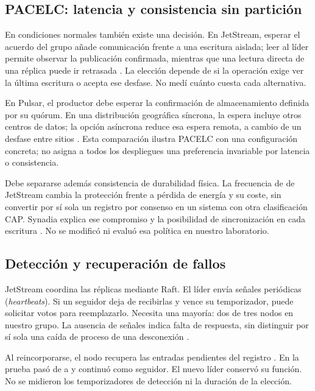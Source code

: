 \documentclass[11pt,a4paper]{article}
\newcommand{\archivo}[1]{\texttt{\detokenize{#1}}}
\begin{document}
\subsection{PACELC: latencia y consistencia sin partición}
En condiciones normales también existe una decisión. En JetStream, esperar el acuerdo del grupo añade comunicación frente a una escritura aislada; leer al líder permite observar la publicación confirmada, mientras que una lectura directa de una réplica puede ir retrasada \cite{natsReplicacion}. La elección depende de si la operación exige ver la última escritura o acepta ese desfase. No medí cuánto cuesta cada alternativa.

En Pulsar, el productor debe esperar la confirmación de almacenamiento definida por su quórum. En una distribución geográfica síncrona, la espera incluye otros centros de datos; la opción asíncrona reduce esa espera remota, a cambio de un desfase entre sitios \cite{pulsarGeo}. Esta comparación ilustra PACELC con una configuración concreta; no asigna a todos los despliegues una preferencia invariable por latencia o consistencia.

Debe separarse además consistencia de durabilidad física. La frecuencia de \archivo{fsync} de JetStream cambia la protección frente a pérdida de energía y su coste, sin convertir por sí sola un registro por consenso en un sistema con otra clasificación CAP. Synadia explica ese compromiso y la posibilidad de sincronización en cada escritura \cite{Twigg2025}. No se modificó ni evaluó esa política en nuestro laboratorio.

\subsection{Detección y recuperación de fallos}
JetStream coordina las réplicas mediante Raft. El líder envía señales periódicas (\textit{heartbeats}). Si un seguidor deja de recibirlas y vence su temporizador, puede solicitar votos para reemplazarlo. Necesita una mayoría: dos de tres nodos en nuestro grupo. La ausencia de señales indica falta de respuesta, sin distinguir por sí sola una caída de proceso de una desconexión \cite{natsRaft}.

Al reincorporarse, el nodo recupera las entradas pendientes del registro \cite{natsReplicacion}. En la prueba pasó de \archivo{outdated} a \archivo{current} y continuó como seguidor. El nuevo líder conservó su función. No se midieron los temporizadores de detección ni la duración de la elección.
\end{document}
